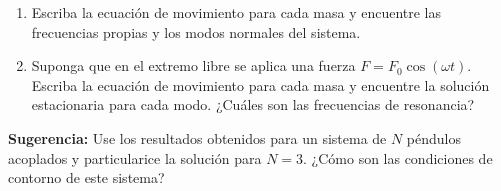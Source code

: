 \documentclass[11pt,spanish]{article}
\begin{document}
\begin{enumerate}
    \begin{enumerate}
        \item Escriba la ecuación de movimiento para cada masa y encuentre las
        frecuencias propias y los modos normales del sistema.

        \item Suponga que en el extremo libre se aplica una fuerza
        $F=F_{0}\cos(\omega t)$. Escriba la ecuación de movimiento para cada
        masa y encuentre la solución estacionaria para cada modo. ¿Cuáles son
        las frecuencias de resonancia?
    \end{enumerate}

    \textbf{Sugerencia:} Use los resultados obtenidos para un sistema de $N$
    péndulos acoplados y particularice la solución para $N=3$. ¿Cómo son las
    condiciones de contorno de este sistema?

\end{enumerate}
\end{document}
